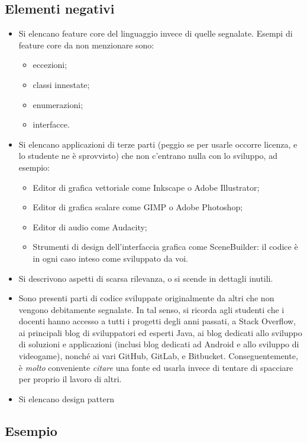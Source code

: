 \documentclass[a4paper,12pt]{report}
\begin{document}
	\subsection*{Elementi negativi}
	\begin{itemize}
		\item Si elencano feature core del linguaggio invece di quelle segnalate. Esempi di feature core da non menzionare sono:
		\begin{itemize}
			\item eccezioni;
			\item classi innestate;
			\item enumerazioni;
			\item interfacce.
		\end{itemize}
		\item Si elencano applicazioni di terze parti (peggio se per usarle occorre licenza, e lo studente ne è sprovvisto) che non c'entrano nulla con lo sviluppo, ad esempio:
		\begin{itemize}
			\item Editor di grafica vettoriale come Inkscape o Adobe Illustrator;
			\item Editor di grafica scalare come GIMP o Adobe Photoshop;
			\item Editor di audio come Audacity;
			\item Strumenti di design dell'interfaccia grafica come SceneBuilder: il codice è in ogni caso inteso come sviluppato da voi.
		\end{itemize}
		\item Si descrivono aspetti di scarsa rilevanza, o si scende in dettagli inutili.
		\item Sono presenti parti di codice sviluppate originalmente da altri che non vengono debitamente segnalate.
		In tal senso, si ricorda agli studenti che i docenti hanno accesso a tutti i progetti degli anni passati,
		a Stack Overflow,
		ai principali blog di sviluppatori ed esperti Java,
		ai blog dedicati allo sviluppo di soluzioni e applicazioni
		(inclusi blog dedicati ad Android e allo sviluppo di videogame),
		nonché ai vari GitHub, GitLab, e Bitbucket.
		Conseguentemente, è \emph{molto} conveniente \emph{citare} una fonte ed usarla invece di tentare di spacciare per proprio il lavoro di altri.
		\item Si elencano design pattern
	\end{itemize}
	
	\subsection{Esempio}
	
\end{document}
